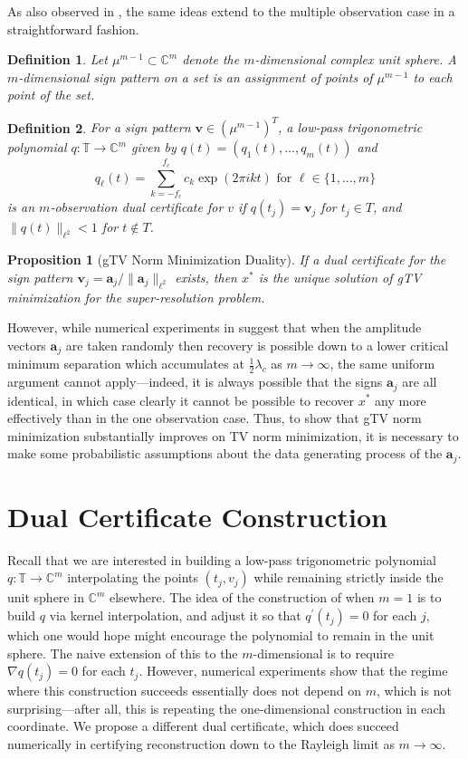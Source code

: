 \documentclass[11pt]{article}
\newcommand{\TT}{\mathbb{T}}
\newcommand{\CC}{\mathbb{C}}
\newcommand{\ba}{\bm a}
\newcommand{\bv}{\bm v}
\newtheorem{definition}{Definition}
\newtheorem{proposition}{Proposition}
\begin{document}
As also observed in \cite{fernandez2016super}, the same ideas extend to the multiple observation case in a straightforward fashion.
\begin{definition}
    Let $\mu^{m - 1} \subset \CC^m$ denote the $m$-dimensional complex unit sphere.
    A \emph{$m$-dimensional sign pattern} on a set is an assignment of points of $\mu^{m - 1}$ to each point of the set.
\end{definition}
\begin{definition}
    For a sign pattern $\bv \in (\mu^{m - 1})^T$, a low-pass trigonometric polynomial $q: \TT \to \CC^m$ given by $q(t) = (q_1(t), \dots, q_m(t))$ and
    \begin{equation}
        q_\ell(t) = \sum_{k = -f_c}^{f_c} c_k \exp(2\pi i k t) \text{ for } \ell \in \{1, \dots, m\}
    \end{equation}
    is an \emph{$m$-observation dual certificate} for $v$ if $q(t_j) = \bv_j$ for $t_j \in T$, and $\|q(t)\|_{\ell^2} < 1$ for $t \notin T$.
\end{definition}
\begin{proposition}[gTV Norm Minimization Duality]
    If a dual certificate for the sign pattern $\bv_j = \ba_{j} / \|\ba_{j}\|_{\ell^2}$ exists, then $x^*$ is the unique solution of gTV minimization for the super-resolution problem.
\end{proposition}
However, while numerical experiments in \cite{fernandez2016super} suggest that when the amplitude vectors $\ba_j$ are taken randomly then recovery is possible down to a lower critical minimum separation which accumulates at $\frac{1}{2}\lambda_c$ as $m \to \infty$, the same uniform argument cannot apply---indeed, it is always possible that the signs $\ba_j$ are all identical, in which case clearly it cannot be possible to recover $x^*$ any more effectively than in the one observation case.
Thus, to show that gTV norm minimization substantially improves on TV norm minimization, it is necessary to make some probabilistic assumptions about the data generating process of the $\ba_j$.

\section{Dual Certificate Construction}

Recall that we are interested in building a low-pass trigonometric polynomial $q: \TT \to \CC^m$ interpolating the points $(t_j, v_j)$ while remaining strictly inside the unit sphere in $\CC^m$ elsewhere.
The idea of the construction of \cite{fernandez2016super} when $m = 1$ is to build $q$ via kernel interpolation, and adjust it so that $q^\prime(t_j) = 0$ for each $j$, which one would hope might encourage the polynomial to remain in the unit sphere.
The naive extension of this to the $m$-dimensional is to require $\nabla q(t_j) = 0$ for each $t_j$.
However, numerical experiments show that the regime where this construction succeeds essentially does not depend on $m$, which is not surprising---after all, this is repeating the one-dimensional construction in each coordinate.
We propose a different dual certificate, which does succeed numerically in certifying reconstruction down to the Rayleigh limit as $m \to \infty$.
\end{document}
